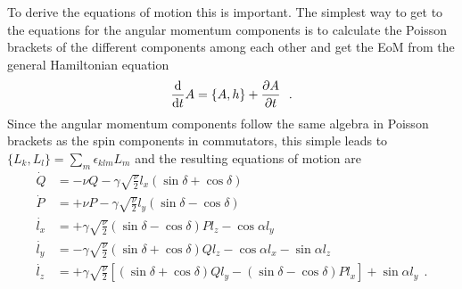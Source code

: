 To derive the equations of motion this is important.
The simplest way to get to the equations for the angular momentum components is to calculate the Poisson brackets of the different components among each other and get the EoM from the general Hamiltonian equation
\begin{equation}
	\frac{\text d}{\text d t} A = \{ A,h \} + \frac{\partial A}{\partial t}~~.
\end{equation}
Since the angular momentum components follow the same algebra in Poisson brackets as the spin components in commutators, this simple leads to  $\{ L_k,L_l\} =  \sum\limits_m \epsilon_{klm} L_m$ and the resulting equations of motion are
\begin{align}
\dot{Q} &= -\nu Q - \gamma \sqrt{\frac \nu 2} l_x \left( \sin\delta  + \cos\delta \right)\\
\dot{P} &= +\nu P - \gamma \sqrt{\frac \nu 2} l_y \left( \sin\delta  - \cos\delta \right)\\
\dot{l_x} &= + \gamma \sqrt{\frac \nu 2} \left( \sin\delta  - \cos\delta \right) P l_z - \cos \alpha l_y\\
\dot{l_y} &= - \gamma \sqrt{\frac \nu 2} \left( \sin\delta  + \cos\delta \right) Q l_z - \cos \alpha l_x - \sin\alpha l_z\\
\dot{l_z} &= + \gamma \sqrt{\frac \nu 2}\left[ \left( \sin\delta  + \cos\delta \right) Q l_y - \left( \sin\delta  - \cos\delta \right) P l_x  \right] + \sin \alpha l_y~~.
\end{align}

